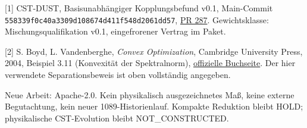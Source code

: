 \documentclass[10pt,a4paper]{article}
\begin{document}
\small
[1] CST-DUST, Basisunabhängiger Kopplungsbefund v0.1, Main-Commit\\
\texttt{558339f0c40a3309d108674d411f548d2061dd57},
\href{https://github.com/thomasmgfeller/x6-spectral-astrolabium/pull/287}{PR 287}.
Gewichtsklasse: Mischungsqualifikation v0.1, eingefrorener Vertrag im Paket.

[2] S. Boyd, L. Vandenberghe, \emph{Convex Optimization}, Cambridge University
Press, 2004, Beispiel 3.11 (Konvexität der Spektralnorm),
\href{https://web.stanford.edu/~boyd/cvxbook/}{offizielle Buchseite}.
Der hier verwendete Separationsbeweis ist oben vollständig angegeben.

Neue Arbeit: Apache-2.0. Kein physikalisch ausgezeichnetes Maß, keine externe
Begutachtung, kein neuer 1089-Historienlauf. Kompakte Reduktion bleibt HOLD;
physikalische CST-Evolution bleibt NOT\_CONSTRUCTED.
\end{document}
